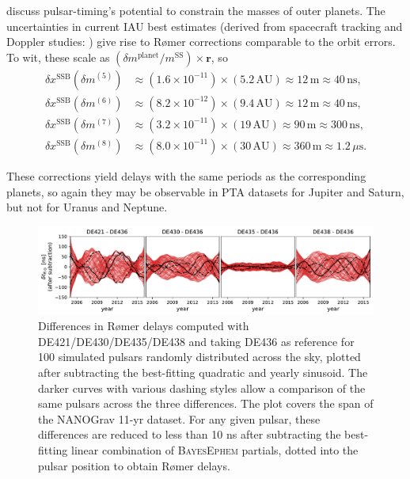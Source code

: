 \documentclass{aastex63}
\begin{document}
\citet{2010ApJ...720L.201C} discuss pulsar-timing's potential to constrain the masses of outer planets. The uncertainties in current IAU best estimates (derived from spacecraft tracking and Doppler studies: \citealt{iaumasses,jh+2000,2006AJ....132.2520J,2014AJ....148...76J,2009AJ....137.4322J}) give rise to R{\o}mer corrections comparable to the orbit errors. To wit, these scale as $(\delta m^\mathrm{planet}/m^\mathrm{SS}) \times \mathbf{r}$, so
%
\begin{equation}
    \begin{aligned}
    \delta x^\mathrm{SSB}(\delta m^{(5)}) & \approx (1.6 \!\times\! 10^{-11})\!\times\!
    (5.2 \, \mathrm{AU})
    \approx 12 \, \mathrm{m} \approx 40 \, \mathrm{ns}, \\
    \delta x^\mathrm{SSB}(\delta m^{(6)}) & \approx (8.2 \!\times\! 10^{-12}) \!\times\!
    (9.4 \, \mathrm{AU})
    \approx 12 \, \mathrm{m} \approx 40 \, \mathrm{ns}, \\
    \delta x^\mathrm{SSB}(\delta m^{(7)}) & \approx (3.2 \!\times\! 10^{-11}) \!\times\!
    (19 \, \mathrm{AU})
    \approx 90 \, \mathrm{m} \approx 300 \, \mathrm{ns}, \\
    \delta x^\mathrm{SSB}(\delta m^{(8)}) & \approx (8.0 \!\times\! 10^{-11}) \!\times\!
    (30 \, \mathrm{AU})
    \approx 360 \, \mathrm{m} \approx 1.2 \, \mu\mathrm{s}.
    \end{aligned}
\end{equation}

These corrections yield delays with the same periods as the corresponding planets, so again they may be observable in PTA datasets for Jupiter and Saturn, but not for Uranus and Neptune.
%
\begin{figure}[t]
    \centering
    \includegraphics[width=\columnwidth]{figures/roemerdiff.pdf}
    \caption{Differences in R{\o}mer delays computed with DE421/DE430/DE435/DE438 and taking DE436 as reference for 100 simulated pulsars randomly distributed across the sky, plotted after subtracting the best-fitting quadratic and yearly sinusoid. The darker curves with various dashing styles allow a comparison of the same pulsars across the three differences. The plot covers the span of the NANOGrav 11-yr dataset.
    For any given pulsar, these differences are reduced to less than 10 ns after subtracting the best-fitting linear combination of \textsc{BayesEphem} partials, dotted into the pulsar position to obtain R{\o}mer delays.
    }
    \label{fig:Roemer}
\end{figure}
\end{document}
